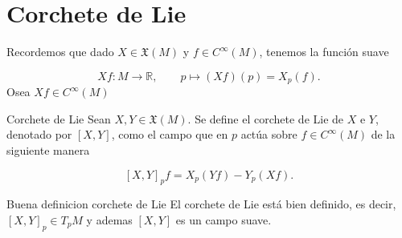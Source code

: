 \section{Corchete de Lie}
\begin{bookremark}{}
Recordemos que dado $X\in\mathfrak X(M)$ y $f\in C^\infty(M)$, tenemos la función suave

\[
Xf:M\to\mathbb R,\qquad p\mapsto (Xf)(p)=X_p(f).
\]
Osea $Xf\in C^{\infty}(M)$

\end{bookremark}
\begin{bookdefinition}{Corchete de Lie}
Sean $X,Y\in\mathfrak X(M)$. Se define el corchete de Lie de $X$ e $Y$, denotado por $[X,Y]$, como el campo que en $p$ actúa sobre $f\in C^\infty(M)$ de la siguiente manera

\[
[X,Y]_p f=X_p(Yf)-Y_p(Xf).
\]
\end{bookdefinition}
\begin{bookproposition}{Buena definicion corchete de Lie}
El corchete de Lie está bien definido, es decir, $[X,Y]_p\in T_pM$ y ademas $[X,Y]$ es un campo suave.

\end{bookproposition}
